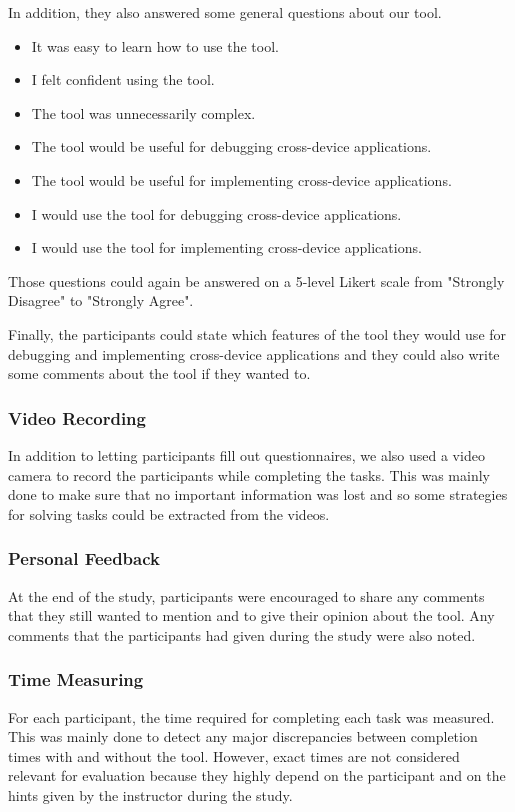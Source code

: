 In addition, they also answered some general questions about our tool.
\begin{itemize}
	\item It was easy to learn how to use the tool.
	\item I felt confident using the tool.
	\item The tool was unnecessarily complex.
	\item The tool would be useful for debugging cross-device applications.
	\item The tool would be useful for implementing cross-device applications.
	\item I would use the tool for debugging cross-device applications.
	\item I would use the tool for implementing cross-device applications.
\end{itemize}
Those questions could again be answered on a 5-level Likert scale from "Strongly Disagree" to "Strongly Agree".

Finally, the participants could state which features of the tool they would use for debugging and implementing cross-device applications and they could also write some comments about the tool if they wanted to.

\subsubsection{Video Recording}
In addition to letting participants fill out questionnaires, we also used a video camera to record the participants while completing the tasks. This was mainly done to make sure that no important information was lost and so some strategies for solving tasks could be extracted from the videos. 

\subsubsection{Personal Feedback}
At the end of the study, participants were encouraged to share any comments that they still wanted to mention and to give their opinion about the tool. Any comments that the participants had given during the study were also noted.

\subsubsection{Time Measuring}
For each participant, the time required for completing each task was measured. This was mainly done to detect any major discrepancies between completion times with and without the tool. However, exact times are not considered relevant for evaluation because they highly depend on the participant and on the hints given by the instructor during the study.


